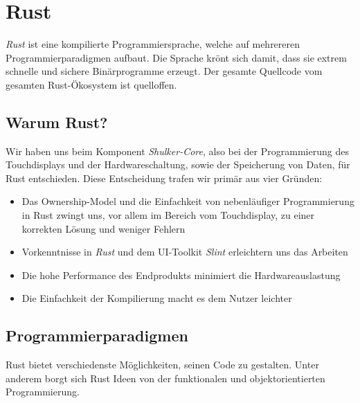 \section{Rust}
\label{Rust}

\textit{Rust} ist eine kompilierte Programmiersprache, welche auf mehrereren
Programmierparadigmen aufbaut. Die Sprache krönt sich damit, dass
sie extrem schnelle und sichere Binärprogramme erzeugt. Der gesamte Quellcode
vom gesamten Rust-Ökosystem ist quelloffen.

\subsection{Warum Rust?}
Wir haben uns beim Komponent \textit{Shulker-Core}, also bei der Programmierung
des Touchdisplays und der Hardwareschaltung, sowie der Speicherung
von Daten, für Rust entschieden. Diese Entscheidung trafen wir primär
aus vier Gründen:

\begin{itemize}
    \item Das Ownership-Model und die Einfachkeit von nebenläufiger Programmierung in Rust zwingt uns, vor allem im Bereich vom Touchdisplay, zu einer korrekten Lösung und weniger Fehlern
    \item Vorkenntnisse in \textit{Rust} und dem UI-Toolkit \textit{Slint} erleichtern uns das Arbeiten
    \item Die hohe Performance des Endprodukts minimiert die Hardwareauslastung
    \item Die Einfachkeit der Kompilierung macht es dem Nutzer leichter
\end{itemize}

\subsection{Programmierparadigmen}
Rust bietet verschiedenste Möglichkeiten, seinen Code zu gestalten. Unter
anderem borgt sich Rust Ideen von der funktionalen und objektorientierten
Programmierung.